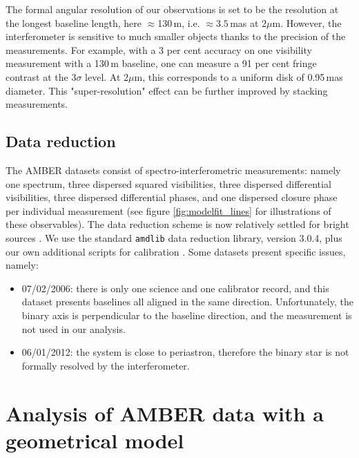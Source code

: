 \documentclass[usenatbib]{mnras}%
\begin{document}
The formal angular resolution of our observations is set to be the resolution at the longest baseline length, here $\approx$130\,m,  i.e. $\approx3.5$\,mas at $2\mu$m. However, the interferometer is sensitive to much smaller objects thanks to the precision of the measurements. For example, with a 3 per cent accuracy on one visibility measurement with a  130\,m baseline, one can measure a 91 per cent fringe contrast at the $3\sigma$ level. At 2$\mu$m, this corresponds to  a uniform disk of 0.95\,mas diameter. This "super-resolution" effect can be further improved by stacking measurements.


\subsection{Data reduction}

The AMBER datasets consist of spectro-interferometric measurements: namely one spectrum, three dispersed squared visibilities, three dispersed differential visibilities, three dispersed differential phases, and one dispersed closure phase per individual measurement (see figure \ref{fig:modelfit_lines} for illustrations of these observables). The data reduction scheme is now relatively settled for bright sources \citep[see details in][]{2007A&A...464...29T, Chelli2009c}. We use the standard \texttt{amdlib} data reduction library, version 3.0.4, plus our own additional scripts  for calibration \citep{Millour2008c}. Some datasets present specific issues, namely:
\begin{itemize}
\item 07/02/2006: there is only one science and one calibrator record, and this dataset presents baselines all aligned in the same direction. Unfortunately, the binary axis is perpendicular to the baseline direction, and the measurement is not used in our analysis.
\item 06/01/2012: the system is close to periastron, therefore the binary star is not formally resolved by the interferometer.
\end{itemize}

\section{Analysis of AMBER data with a geometrical model}\label{sec:data_model}
\end{document}
